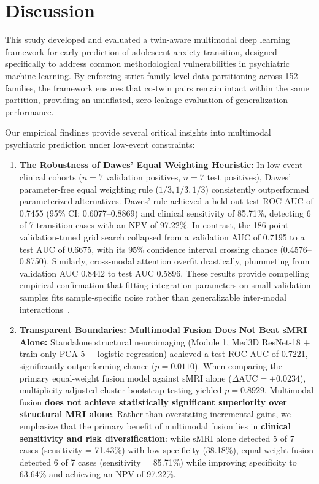 \documentclass[10pt,letterpaper]{article}
\begin{document}
\section*{Discussion}

This study developed and evaluated a twin-aware multimodal deep learning framework for early prediction of adolescent anxiety transition, designed specifically to address common methodological vulnerabilities in psychiatric machine learning. By enforcing strict family-level data partitioning across 152 families, the framework ensures that co-twin pairs remain intact within the same partition, providing an uninflated, zero-leakage evaluation of generalization performance.

Our empirical findings provide several critical insights into multimodal psychiatric prediction under low-event constraints:
\begin{enumerate}
    \item \textbf{The Robustness of Dawes' Equal Weighting Heuristic:} In low-event clinical cohorts ($n=7$ validation positives, $n=7$ test positives), Dawes' parameter-free equal weighting rule ($1/3, 1/3, 1/3$) consistently outperformed parameterized alternatives. Dawes' rule achieved a held-out test ROC-AUC of 0.7455 (95\% CI: 0.6077--0.8869) and clinical sensitivity of 85.71\%, detecting 6 of 7 transition cases with an NPV of 97.22\%. In contrast, the 186-point validation-tuned grid search collapsed from a validation AUC of 0.7195 to a test AUC of 0.6675, with its 95\% confidence interval crossing chance (0.4576--0.8750). Similarly, cross-modal attention overfit drastically, plummeting from validation AUC 0.8442 to test AUC 0.5896. These results provide compelling empirical confirmation that fitting integration parameters on small validation samples fits sample-specific noise rather than generalizable inter-modal interactions~\cite{ref_dawes}.
    \item \textbf{Transparent Boundaries: Multimodal Fusion Does Not Beat sMRI Alone:} Standalone structural neuroimaging (Module 1, Med3D ResNet-18 + train-only PCA-5 + logistic regression) achieved a test ROC-AUC of 0.7221, significantly outperforming chance ($p = 0.0110$). When comparing the primary equal-weight fusion model against sMRI alone ($\Delta\text{AUC} = +0.0234$), multiplicity-adjusted cluster-bootstrap testing yielded $p = 0.8929$. Multimodal fusion \textbf{does not achieve statistically significant superiority over structural MRI alone}. Rather than overstating incremental gains, we emphasize that the primary benefit of multimodal fusion lies in \textbf{clinical sensitivity and risk diversification}: while sMRI alone detected 5 of 7 cases (sensitivity = 71.43\%) with low specificity (38.18\%), equal-weight fusion detected 6 of 7 cases (sensitivity = 85.71\%) while improving specificity to 63.64\% and achieving an NPV of 97.22\%.

\end{enumerate}
\end{document}
